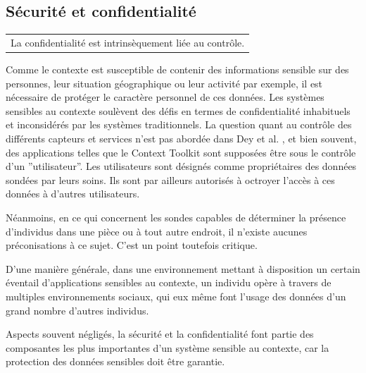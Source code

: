 \subsection{Sécurité et confidentialité}

{%
    \centering
    \begin{tabular}{l}
        La confidentialité est intrinsèquement liée au contrôle.
        \cite{ackerman_privacy_2001} \\
    \end{tabular}
\par}%


Comme le contexte est susceptible de contenir des informations sensible sur des
personnes, leur situation géographique ou leur activité par exemple, il est
nécessaire de protéger le caractère personnel de ces données. Les systèmes
sensibles au contexte soulèvent des défis en termes de confidentialité
inhabituels et inconsidérés par les systèmes traditionnels. La question quant au
contrôle des différents capteurs et services n'est pas abordée dans Dey et al.
\cite{dey_conceptual_2001}, et bien souvent, des applications telles que le
Context Toolkit sont supposées être sous le contrôle d'un ''utilisateur''. Les
utilisateurs sont désignés comme propriétaires des données sondées par leurs
soins. Ils sont par ailleurs autorisés à octroyer l'accès à ces données à
d'autres utilisateurs.

Néanmoins, en ce qui concernent les sondes capables de déterminer la présence
d'individus dans une pièce ou à tout autre endroit, il n'existe aucunes
préconisations à ce sujet. C'est un point toutefois critique.

D'une manière générale, dans une environnement mettant à disposition un certain
éventail d'applications sensibles au contexte, un individu opère à travers de
multiples environnements sociaux, qui eux même font l'usage des données d'un
grand nombre d'autres individus.

Aspects souvent négligés, la sécurité et la confidentialité font partie des
composantes les plus importantes d'un système sensible au contexte, car la
protection des données sensibles doit être garantie.


